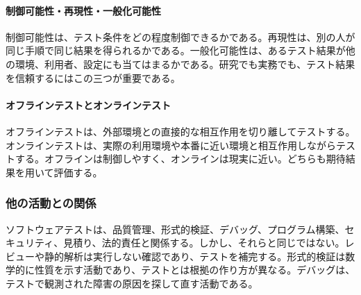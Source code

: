 \paragraph{制御可能性・再現性・一般化可能性}
制御可能性は、テスト条件をどの程度制御できるかである。再現性は、別の人が同じ手順で同じ結果を得られるかである。一般化可能性は、あるテスト結果が他の環境、利用者、設定にも当てはまるかである。研究でも実務でも、テスト結果を信頼するにはこの三つが重要である。

\paragraph{オフラインテストとオンラインテスト}
オフラインテストは、外部環境との直接的な相互作用を切り離してテストする。オンラインテストは、実際の利用環境や本番に近い環境と相互作用しながらテストする。オフラインは制御しやすく、オンラインは現実に近い。どちらも期待結果を用いて評価する。

\subsubsection{他の活動との関係}
ソフトウェアテストは、品質管理、形式的検証、デバッグ、プログラム構築、セキュリティ、見積り、法的責任と関係する。しかし、それらと同じではない。レビューや静的解析は実行しない確認であり、テストを補完する。形式的検証は数学的に性質を示す活動であり、テストとは根拠の作り方が異なる。デバッグは、テストで観測された障害の原因を探して直す活動である。
